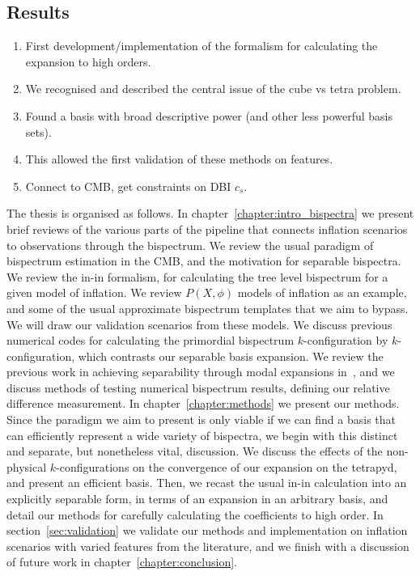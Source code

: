     \subsection{Results}
    \begin{enumerate}
        \item First development/implementation of the formalism for calculating the expansion to high orders.
        \item We recognised and described the central issue of the cube vs tetra problem.
        \item Found a basis with broad descriptive power (and other less powerful basis sets).
        \item This allowed the first validation of these methods on features.
        \item Connect to CMB, get constraints on DBI $c_s$.
    \end{enumerate}

The thesis is organised as follows. In chapter~\ref{chapter:intro_bispectra} we present brief reviews
of the various parts of the pipeline that connects inflation scenarios to observations
through the bispectrum.
We review the usual paradigm of bispectrum estimation in the CMB,
and the motivation for separable bispectra. We review the in-in formalism,
for calculating the tree level bispectrum for a given model of inflation.
We review $P(X,\phi)$ models of inflation as an example, and
some of the usual approximate bispectrum templates
that we aim to bypass.
We will draw our validation scenarios from these models.
We discuss previous numerical codes for
calculating the primordial bispectrum $k$-configuration by $k$-configuration,
which contrasts our separable basis expansion.
We review the previous work in achieving separability through modal expansions
in~\cite{Funakoshi},
and we discuss methods of testing
numerical bispectrum results, defining our relative difference measurement.
In chapter~\ref{chapter:methods} we present our methods.
Since the paradigm we aim to present is only viable if we can find a basis
that can efficiently represent a wide variety of bispectra,
we begin with this distinct and separate, but nonetheless vital, discussion.
We discuss the effects of the
non-physical $k$-configurations on the convergence of our expansion on
the tetrapyd, and present an efficient basis.
Then, we recast the usual in-in calculation into an explicitly separable form,
in terms of an expansion in an arbitrary basis,
and detail our methods for carefully calculating the coefficients to high order.
In section~\ref{sec:validation} we validate our methods and implementation
on inflation scenarios with varied features from the literature,
and we finish with a discussion of future work in chapter~\ref{chapter:conclusion}.

